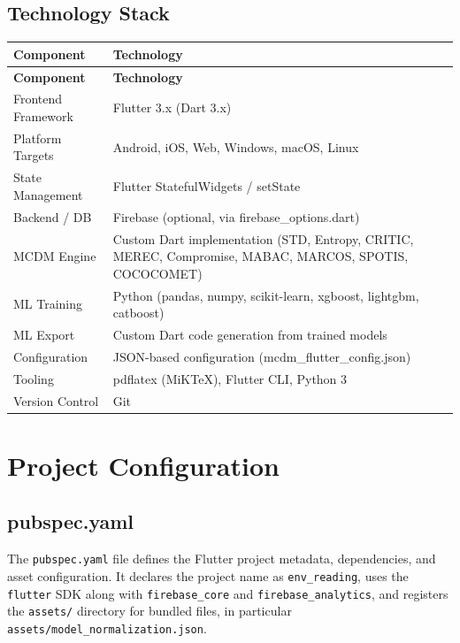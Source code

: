 \documentclass[12pt,a4paper,oneside]{report}
\newcommand{\code}[1]{\texttt{#1}}
\begin{document}
\section{Technology Stack}

\begin{longtable}{p{3.5cm} p{11cm}}
\toprule
\textbf{Component} & \textbf{Technology} \\
\midrule
\endfirsthead
\toprule
\textbf{Component} & \textbf{Technology} \\
\midrule
\endhead
\bottomrule
\endfoot
Frontend Framework & Flutter 3.x (Dart 3.x) \\
Platform Targets & Android, iOS, Web, Windows, macOS, Linux \\
State Management & Flutter StatefulWidgets / setState \\
Backend / DB & Firebase (optional, via firebase\_options.dart) \\
MCDM Engine & Custom Dart implementation (STD, Entropy, CRITIC, MEREC, Compromise, MABAC, MARCOS, SPOTIS, COCOCOMET) \\
ML Training & Python (pandas, numpy, scikit-learn, xgboost, lightgbm, catboost) \\
ML Export & Custom Dart code generation from trained models \\
Configuration & JSON-based configuration (mcdm\_flutter\_config.json) \\
Tooling & pdflatex (MiKTeX), Flutter CLI, Python 3 \\
Version Control & Git \\
\bottomrule
\end{longtable}

\chapter{Project Configuration}
\label{ch:config}

\section{pubspec.yaml}

The \texttt{pubspec.yaml} file defines the Flutter project metadata, dependencies, and asset configuration. It declares the project name as \code{env\_reading}, uses the \code{flutter} SDK along with \code{firebase\_core} and \code{firebase\_analytics}, and registers the \texttt{assets/} directory for bundled files, in particular \texttt{assets/model\_normalization.json}.
\end{document}
